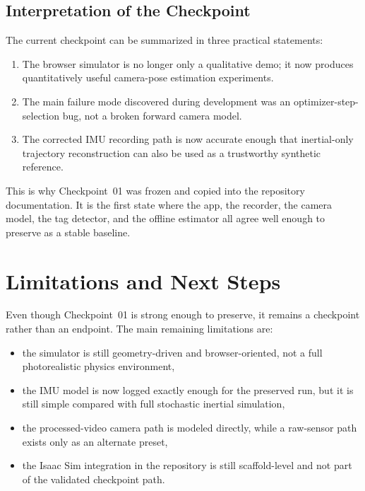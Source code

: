 \documentclass[11pt,a4paper]{article}
\begin{document}
\subsection{Interpretation of the Checkpoint}

The current checkpoint can be summarized in three practical statements:

\begin{enumerate}
  \item The browser simulator is no longer only a qualitative demo; it now produces quantitatively useful camera-pose estimation experiments.
  \item The main failure mode discovered during development was an optimizer-step-selection bug, not a broken forward camera model.
  \item The corrected IMU recording path is now accurate enough that inertial-only trajectory reconstruction can also be used as a trustworthy synthetic reference.
\end{enumerate}

This is why Checkpoint~01 was frozen and copied into the repository documentation.
It is the first state where the app, the recorder, the camera model, the tag detector, and the offline estimator all agree well enough to preserve as a stable baseline.

\section{Limitations and Next Steps}

Even though Checkpoint~01 is strong enough to preserve, it remains a checkpoint rather than an endpoint.
The main remaining limitations are:

\begin{itemize}
  \item the simulator is still geometry-driven and browser-oriented, not a full photorealistic physics environment,
  \item the IMU model is now logged exactly enough for the preserved run, but it is still simple compared with full stochastic inertial simulation,
  \item the processed-video camera path is modeled directly, while a raw-sensor path exists only as an alternate preset,
  \item the Isaac Sim integration in the repository is still scaffold-level and not part of the validated checkpoint path.
\end{itemize}
\end{document}
